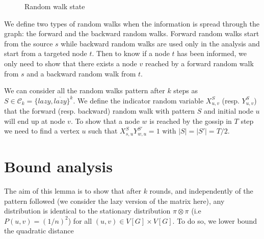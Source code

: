\documentclass[10pt,journal,a4paper]{IEEEtran}
\begin{document}
\begin{figure}[h]
\centering
{}
\caption{Random walk state}
\label{fig:lazyFSM}
\end{figure}

We define two types of random walks when the information is spread through the graph: the forward and the backward random walks. Forward random walks start from the source $s$ while backward random walks are used only in the analysis and start from a targeted node $t$. Then to know if a node $t$ has been informed, we only need to show that there exists a node $v$ reached by a forward random walk from $s$ and a backward random walk from $t$.

We can consider all the random walks pattern after $k$ steps as $S \in \mathcal C_k = \{ lazy, \overline{lazy} \}^k$. We define the indicator random variable $X_{u,v}^S$ (resp. $Y_{u,v}^S$) that the forward (resp. backward) random walk with pattern $S$ and initial node $u$ will end up at node $v$. To show that a node $w$ is reached by the gossip in $T$ step we need to find a vertex $u$ such that $X_{s,u}^{S}Y_{w,u}^{S'} = 1$ with $|S| = |S'| = T/2$.

\section{Bound analysis}

The aim of this lemma is to show that after $k$ rounds, and independently of the pattern followed (we consider the lazy version of the matrix here), any distribution is identical to the stationary distribution $\pi \otimes \pi$ (i.e $P(u,v)=(1/n)^2$) for all $(u,v) \in V[G] \times V[G]$. To do so, we lower bound the quadratic distance
\end{document}
